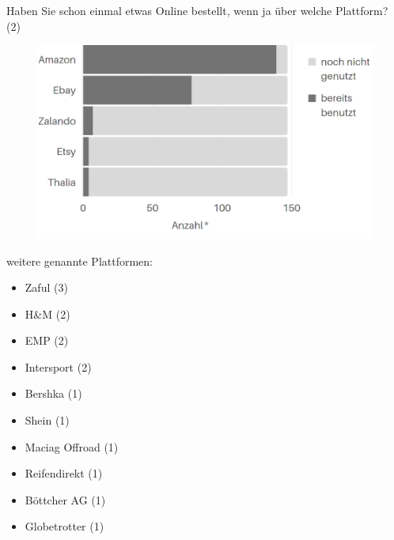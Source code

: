 \newpage\noindent Haben Sie schon einmal etwas Online bestellt, wenn ja über welche Plattform? (2)\\
\begin{figure}[H]
    \begin{center}
        \includegraphics[width=11.5cm]{media/schuelerumfrage/2.png} 
    \end{center}
\end{figure}

\noindent weitere genannte Plattformen:
\begin{itemize}
 \item Zaful (3)
 \item H\&M (2)
 \item EMP (2)
 \item Intersport (2)
 \item Bershka (1)
 \item Shein (1)
 \item Maciag Offroad (1)
 \item Reifendirekt (1)
 \item Böttcher AG (1)
 \item Globetrotter (1)
\end{itemize}



